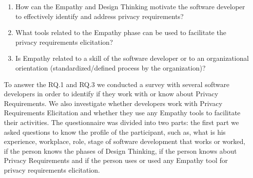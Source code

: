 \documentclass[conference]{IEEEtran}
\begin{document}
\begin{enumerate}[RQ.1:]
    \item How can the Empathy and Design Thinking motivate the software developer to effectively identify and address privacy requirements?
    \item What tools related to the Empathy phase can be used to facilitate the privacy requirements elicitation?
    \item Is Empathy related to a skill of the software developer or to an organizational orientation (standardized/defined process by the organization)?

\end{enumerate}


To answer the RQ.1 and RQ.3 we conducted a survey with several software developers in order to identify if they work with or know about Privacy Requirements. We also investigate whether developers work with Privacy Requirements Elicitation and whether they use any Empathy tools to facilitate their activities. The questionnaire was divided into two parts: the first part we asked questions to know the profile of the participant, such as, what is his experience, workplace, role, stage of software development that works or worked, if the person knows the phases of Design Thinking, if the person knows about Privacy Requirements and if the person uses or used any Empathy tool for privacy requirements elicitation.
\end{document}
